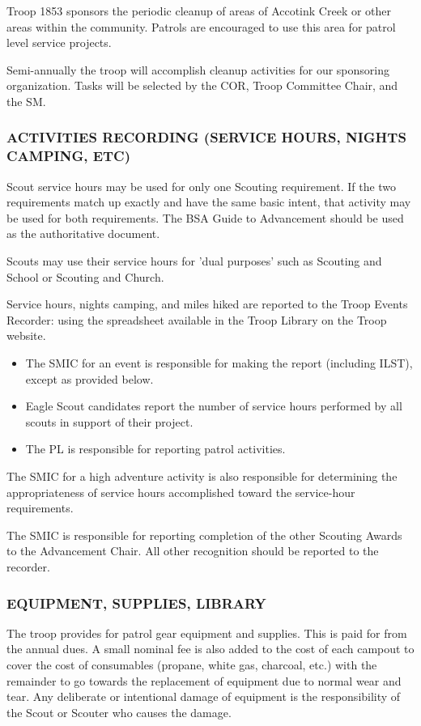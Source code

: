 \documentclass{ltxguide}
\begin{document}
Troop 1853 sponsors the periodic cleanup of areas of Accotink Creek or other areas within the community. Patrols are encouraged to use this area for patrol level service projects.

Semi-annually the troop will accomplish cleanup activities for our sponsoring organization. Tasks will be selected by the \ac{COR}, Troop Committee Chair, and the \ac{SM}.

\subsubsection{ACTIVITIES RECORDING (SERVICE HOURS, NIGHTS CAMPING, ETC)}
Scout service hours may be used for only one Scouting requirement. If the two requirements match up exactly and have the same basic intent, that activity may be used for both requirements. The \ac{BSA} Guide to Advancement should be used as the authoritative document.

Scouts may use their service hours for 'dual purposes' such as Scouting and School or Scouting and Church.

Service hours, nights camping, and miles hiked are reported to the Troop Events Recorder: using the spreadsheet available in the Troop Library on the Troop website.

\begin{itemize}
	\item The SMIC for an event is responsible for making the report (including ILST), except as provided below.
	\item Eagle Scout candidates report the number of service hours performed by all scouts in support of their project.
	\item The \ac{PL} is responsible for reporting patrol activities.
\end{itemize}

The SMIC for a high adventure activity is also responsible for determining the appropriateness of service hours accomplished toward the service-hour requirements.

The SMIC is responsible for reporting completion of the other Scouting Awards to the Advancement Chair. All other recognition should be reported to the recorder.

\subsubsection{EQUIPMENT, SUPPLIES, LIBRARY}
The troop provides for patrol gear equipment and supplies. This is paid for from the annual dues. A small nominal fee is also added to the cost of each campout to cover the cost of consumables (propane, white gas, charcoal, etc.) with the remainder to go towards the replacement of equipment due to normal wear and tear. Any deliberate or intentional damage of equipment is the responsibility of the Scout or Scouter who causes the damage.
\end{document}
